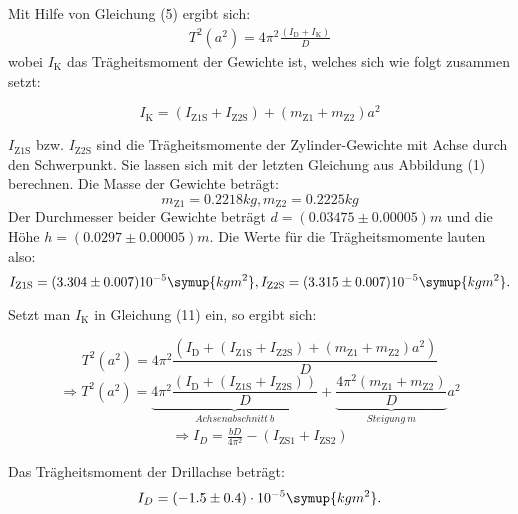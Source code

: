 Mit Hilfe von Gleichung (5) ergibt sich:
\begin{align}
  T^2(a^2) = 4\pi^2\frac{(I_\text{D}+I_\text{K})}{D}
\end{align}
wobei $I_\text{K}$ das Trägheitsmoment der Gewichte ist, welches sich wie folgt zusammen setzt:

\begin{equation}
 I_\text{K} = (I_\text{Z1S}+I_\text{Z2S})+(m_\text{Z1}+m_\text{Z2})a^2
\end{equation}

$I_\text{Z1S}$ bzw. $I_\text{Z2S}$ sind die Trägheitsmomente der Zylinder-Gewichte mit Achse durch den Schwerpunkt.
Sie lassen sich mit der letzten Gleichung aus Abbildung (1) berechnen.
Die Masse der Gewichte beträgt:
\begin{equation}
m_\text{Z1} = 0.2218 kg , m_\text{Z2} = 0.2225 kg
\end{equation}
Der Durchmesser beider Gewichte beträgt $d = (0.03475 \pm 0.00005)m$ und die Höhe $h = (0.0297 \pm 0.00005)m$.
Die Werte für die Trägheitsmomente lauten also:
\begin{equation}
I_\text{Z1S} = (3.304 \pm 0.007)10^{-5} \symup{kgm^2}  , I_\text{Z2S} = (3.315 \pm 0.007)10^{-5} \symup{kgm^2} .
\end{equation}

Setzt man $I_\text{K}$ in Gleichung (11) ein, so ergibt sich:

\begin{equation}
 T^2(a^2) = 4\pi^2\frac{(I_\text{D}+(I_\text{Z1S}+I_\text{Z2S})+(m_\text{Z1}+m_\text{Z2})a^2)}{D}
\end{equation}
\begin{equation}
 \Rightarrow T^2(a^2) = \underbrace{4\pi^2\frac{(I_\text{D}+(I_\text{Z1S}+I_\text{Z2S}))}{D}}_{Achsenabschnitt \: b} + \underbrace{\frac{4\pi^2(m_\text{Z1}+m_\text{Z2})}{D}}_{Steigung \: m} a^2
 \end{equation}
 \begin{align}
  \Rightarrow I_D = \frac{bD}{4\pi^2}-(I_\text{ZS1}+I_\text{ZS2})
 \end{align}

 Das Trägheitsmoment der Drillachse beträgt:
 \begin{equation}
 I_D= (-1.5 \pm 0.4) \cdot 10^{-5} \symup{kgm^2} .
 \end{equation}


